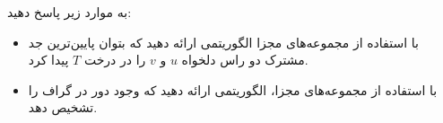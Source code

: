 به موارد زیر پاسخ دهید:
\begin{itemize}
\item 
با استفاده از مجموعه‌های مجزا الگوریتمی ارائه دهید که بتوان پایین‌ترین جد مشترک دو راس دلخواه $u$ و $v$ را در
درخت $T$ پیدا کرد.

\item 
با استفاده از مجموعه‌های مجزا، الگوریتمی ارائه دهید که وجود دور در گراف را تشخیص دهد.

\end{itemize}
